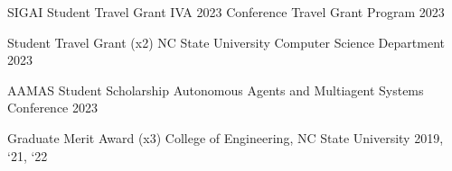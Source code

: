 \vspace{-10pt}
\vspace{-6pt}

\begin{cvhonors}

  \cvhonor
    {SIGAI Student Travel Grant} %
    {IVA 2023 Conference Travel Grant Program} %
    {}
    {2023} %



  \cvhonor
    {Student Travel Grant (x2)} %
    {NC State University Computer Science Department} %
    {}
    {2023} %

  \cvhonor
    {AAMAS Student Scholarship} %
    {Autonomous Agents and Multiagent Systems Conference} %
    {}
    {2023} %

  \cvhonor
    {Graduate Merit Award (x3)} %
    {College of Engineering, NC State University} %
    {}
    {2019, `21, `22} %


\end{cvhonors}
